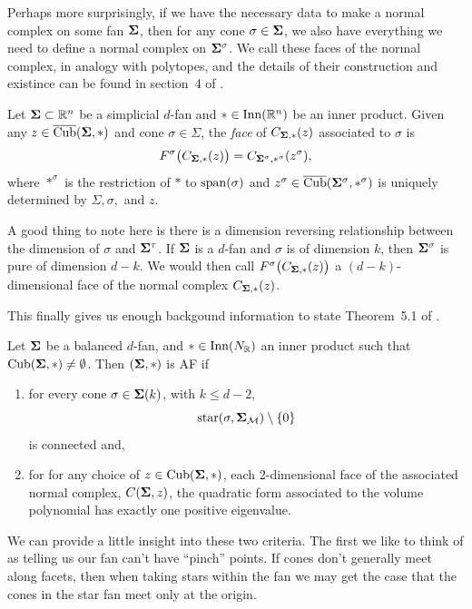 \documentclass[12pt,oneside]{../../sfsuthesis}
\begin{document}
Perhaps more surprisingly, if we have the necessary data to make a normal complex on some fan \( \bm{\Sigma} \), then for any cone \( \sigma \in \bm{\Sigma} \), we also have everything we need to define a normal complex on \( \bm{\Sigma}^\sigma \).
We call these faces of the normal complex, in analogy with polytopes, and the details of their construction and existince can be found in section~4 of \cite{nowakMixedVolumesNormal2023}.
\begin{definition}\th\label{def:faceNC}
    Let \( \bm{\Sigma} \subset \mathbb{R}^n \) be a simplicial \( d \)-fan and \( \ast \in \operatorname{Inn}(\mathbb{R}^n) \) be an inner product.
    Given any \( z \in \operatorname{\overline{Cub}}(\bm{\Sigma}, \ast) \) and cone \( \sigma \in \Sigma \), the \emph{face} of \( C_{\bm{\Sigma}, \ast}(z) \) associated to \( \sigma \) is
    \[
        F^\sigma\big(C_{\bm{\Sigma}, \ast}(z)\big)  = C_{\bm{\Sigma}^\sigma, \ast^\sigma}(z^\sigma),
    \]
    where \( \ast^\sigma \) is the restriction of \( \ast \) to \( \operatorname{span}(\sigma) \) and \( z^\sigma \in \operatorname{\overline{Cub}}(\bm{\Sigma}^\sigma, \ast^\sigma) \) is uniquely determined by \( \Sigma, \sigma, \) and \( z \).
\end{definition}
A good thing to note here is there is a dimension reversing relationship between the dimension of \( \sigma \) and \( \bm{\Sigma}^\tau \).
If \( \bm{\Sigma} \) is a \( d \)-fan and \( \sigma \) is of dimension \( k \), then \( \bm{\Sigma}^\sigma \) is pure of dimension \( d-k \).
We would then call \( F^\sigma\big(C_{\bm{\Sigma}, \ast}(z)\big) \) a \( (d-k) \)-dimensional face of the normal complex \( C_{\bm{\Sigma}, \ast}(z) \).

This finally gives us enough backgound information to state Theorem~5.1 of \cite{nowakMixedVolumesNormal2023}.
\begin{theorem}\th\label{thm:suffAF}
    Let \( \bm{\Sigma} \) be a balanced \( d \)-fan, and \( \ast \in \mathrm{Inn}(N_{\mathbb{R}}) \) an inner product such that \( \operatorname{Cub}(\bm{\Sigma}, \ast) \neq \emptyset \).
    Then \( (\bm{\Sigma}, \ast) \) is AF if
    \begin{enumerate}[label=\roman*.]
        \item for every cone \( \sigma \in \bm{\Sigma}(k) \), with \( k \leq d - 2 \),
              \[
                  \operatorname{star}(\sigma, \bm{\Sigma}_{\mathcal{M}}) \setminus \{ 0 \}
              \]
              is connected and,
        \item for for any choice of \( z \in \operatorname{Cub}(\bm{\Sigma}, \ast) \), each 2-dimensional face of the associated normal complex, \( C(\bm{\Sigma}, z) \), the quadratic form associated to the volume polynomial has exactly one positive eigenvalue.
    \end{enumerate}
\end{theorem}
We can provide a little insight into these two criteria.
The first we like to think of as telling us our fan can't have ``pinch'' points.
If cones don't generally meet along facets, then when taking stars within the fan we may get the case that the cones in the star fan meet only at the origin.
\end{document}

